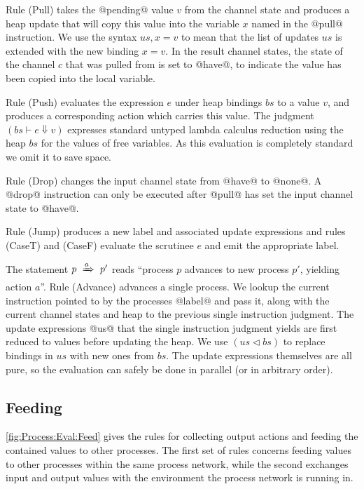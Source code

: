 Rule (Pull) takes the @pending@ value $v$ from the channel state and produces a heap update that will copy this value into the variable $x$ named in the @pull@ instruction. We use the syntax $us,x=v$ to mean that the list of updates $us$ is extended with the new binding $x=v$. In the result channel states, the state of the channel $c$ that was pulled from is set to @have@, to indicate the value has been copied into the local variable.

Rule (Push) evaluates the expression $e$ under heap bindings $bs$ to a value $v$, and produces a corresponding action which carries this value. The judgment $(bs \vdash e \Downarrow v)$ expresses standard untyped lambda calculus reduction using the heap $bs$ for the values of free variables. As this evaluation is completely standard we omit it to save space.

Rule (Drop) changes the input channel state from @have@ to @none@. A @drop@ instruction can only be executed after @pull@ has set the input channel state to @have@. 

Rule (Jump) produces a new label and associated update expressions and rules (CaseT) and (CaseF) evaluate the scrutinee $e$ and emit the appropriate label.

The statement $p~\xRightarrow{a}~p'$ reads ``process $p$ advances to new process $p'$, yielding action $a$''. Rule (Advance) advances a single process. We lookup the current instruction pointed to by the processes @label@ and pass it, along with the current channel states and heap to the previous single instruction judgment. The update expressions @us@ that the single instruction judgment yields are first reduced to values before updating the heap. We use $(us \lhd bs)$ to replace bindings in $us$ with new ones from $bs$. The update expressions themselves are all pure, so the evaluation can safely be done in parallel (or in arbitrary order).


\subsection{Feeding}
\autoref{fig:Process:Eval:Feed} gives the rules for collecting output actions and feeding the contained values to other processes. The first set of rules concerns feeding values to other processes within the same process network, while the second exchanges input and output values with the environment the process network is running in.

